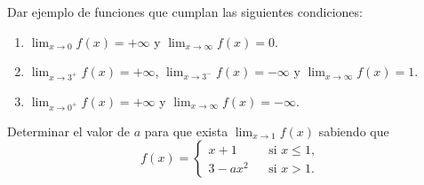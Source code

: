 
{Dar ejemplo de funciones que cumplan las siguientes condiciones:
\begin{enumerate}
  \item $\lim_{x\rightarrow 0}f(x)=+\infty$ y $\lim_{x\rightarrow
  \infty}f(x)=0$.

  \item $\lim_{x\rightarrow 3^+}f(x)=+\infty$, $\lim_{x\rightarrow
  3^-}f(x)=-\infty$ y $\lim_{x\rightarrow \infty}f(x)=1$.

  \item $\lim_{x\rightarrow 0^+}f(x)=+\infty$ y $\lim_{x\rightarrow
  \infty}f(x)=-\infty$.
\end{enumerate}
}


{Determinar el valor de $a$ para que exista $\lim_{x\rightarrow 1}f(x)$ sabiendo que
\[ f(x)=\left\{
  \begin{array}{lll}
    x+1 & & \mbox{si }x\leq 1,\\
    3-ax^2 & & \mbox{si } x>1.
  \end{array}
   \right.
\]
}


